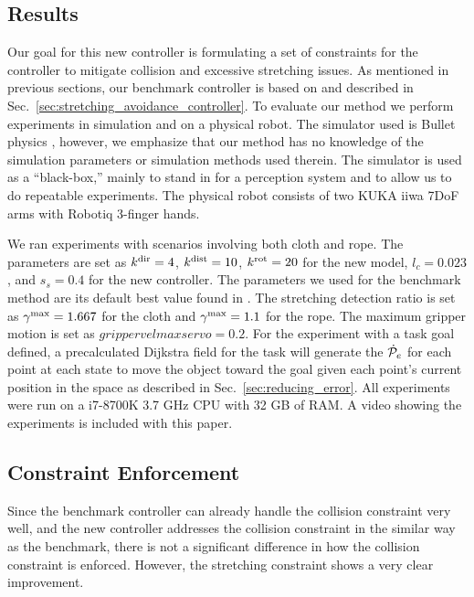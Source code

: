 
\subsection{Results}
\label{sec:stretching_constraint_controller_results}

Our goal for this new controller is formulating a set of constraints for the controller to mitigate collision and excessive stretching issues. As mentioned in previous sections, our benchmark controller is based on \cite{Berenson2013} and described in Sec.~\ref{sec:stretching_avoidance_controller}. To evaluate our method we perform experiments in simulation and on a physical robot. The simulator used is Bullet physics \cite{Coumans2010}, however, we emphasize that our method has no knowledge of the simulation parameters or simulation methods used therein. The simulator is used as a ``black-box,'' mainly to stand in for a perception system and to allow us to do repeatable experiments. The physical robot consists of two KUKA iiwa 7DoF arms with Robotiq 3-finger hands.


We ran experiments with scenarios involving both cloth and rope. The parameters are set as $k^\textrm{dir} = 4$, $k^\textrm{dist} = 10$, $k^{\textrm{rot}} = 20$ for the new model, $l_c = 0.023$, and $s_s = 0.4$ for the new controller. The parameters we used for the benchmark method are its default best value found in \cite{McConachie2018}. The stretching detection ratio is set as $\gamma^{\textrm{max}} = 1.667$ for the cloth and $\gamma^{\textrm{max}} = 1.1$ for the rope. The maximum gripper motion is set as $grippervelmaxservo = 0.2$. For the experiment with a task goal defined, a precalculated Dijkstra field for the task will generate the $\dot{\mathcal{P}}_e$ for each point at each state to move the object toward the goal given each point's current position in the space as described in Sec.~\ref{sec:reducing_error}. All experiments were run on a i7-8700K 3.7 GHz CPU with 32 GB of RAM. A video showing the experiments is included with this paper.


\subsection{Constraint Enforcement}
\label{Results: Object Stretching Avoidance}

Since the benchmark controller can already handle the collision constraint very well, and the new controller addresses the collision constraint in the similar way as the benchmark, there is not a significant difference in how the collision constraint is enforced. However, the stretching constraint shows a very clear improvement.

